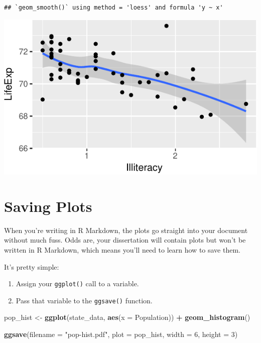 \documentclass[
  12pt,
  oneside,openany]{book}
\newenvironment{Shaded}{\begin{snugshade}}{\end{snugshade}}
\newcommand{\DataTypeTok}[1]{\textcolor[rgb]{0.13,0.29,0.53}{#1}}
\newcommand{\DecValTok}[1]{\textcolor[rgb]{0.00,0.00,0.81}{#1}}
\newcommand{\KeywordTok}[1]{\textcolor[rgb]{0.13,0.29,0.53}{\textbf{#1}}}
\newcommand{\NormalTok}[1]{#1}
\newcommand{\OperatorTok}[1]{\textcolor[rgb]{0.81,0.36,0.00}{\textbf{#1}}}
\newcommand{\StringTok}[1]{\textcolor[rgb]{0.31,0.60,0.02}{#1}}
\providecommand{\tightlist}{%
  \setlength{\itemsep}{0pt}\setlength{\parskip}{0pt}}
\begin{document}
\begin{verbatim}
## `geom_smooth()` using method = 'loess' and formula 'y ~ x'
\end{verbatim}

\includegraphics{pdaps_files/figure-latex/combine-1.pdf}

\hypertarget{saving-plots}{%
\section{Saving Plots}\label{saving-plots}}

When you're writing in R Markdown, the plots go straight into your document without much fuss. Odds are, your dissertation will contain plots but won't be written in R Markdown, which means you'll need to learn how to save them.

It's pretty simple:

\begin{enumerate}
\def\labelenumi{\arabic{enumi}.}
\tightlist
\item
  Assign your \texttt{ggplot()} call to a variable.
\item
  Pass that variable to the \texttt{ggsave()} function.
\end{enumerate}

\begin{Shaded}
\begin{Highlighting}[]
\NormalTok{pop\_hist <{-}}\StringTok{ }\KeywordTok{ggplot}\NormalTok{(state\_data, }\KeywordTok{aes}\NormalTok{(}\DataTypeTok{x =}\NormalTok{ Population)) }\OperatorTok{+}
\StringTok{  }\KeywordTok{geom\_histogram}\NormalTok{()}

\KeywordTok{ggsave}\NormalTok{(}\DataTypeTok{filename =} \StringTok{"pop{-}hist.pdf"}\NormalTok{,}
       \DataTypeTok{plot =}\NormalTok{ pop\_hist,}
       \DataTypeTok{width =} \DecValTok{6}\NormalTok{,}
       \DataTypeTok{height =} \DecValTok{3}\NormalTok{)}
\end{Highlighting}
\end{Shaded}
\end{document}
